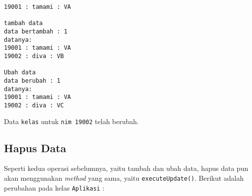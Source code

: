 \begin{lstlisting}
19001 : tamami : VA

tambah data
data bertambah : 1
datanya:
19001 : tamami : VA
19002 : diva : VB

Ubah data
data berubah : 1
datanya:
19001 : tamami : VA
19002 : diva : VC
\end{lstlisting}

Data \texttt{kelas} untuk \texttt{nim 19002} telah berubah.

\subsection{Hapus Data}

Seperti kedua operasi sebelumnya, yaitu tambah dan ubah data, hapus data pun akan menggunakan \textit{method} yang sama, yaitu \texttt{executeUpdate()}. Berikut adalah perubahan pada kelas \texttt{Aplikasi} :


